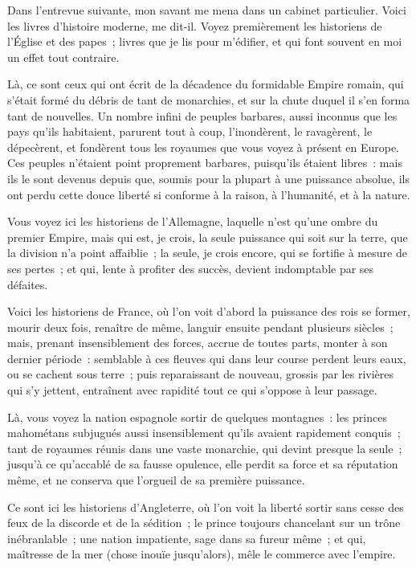 \documentclass[french,twoside]{book} %
\begin{document}
\noindent Dans l’entrevue suivante, mon savant me mena dans un cabinet particulier. Voici les livres d’histoire moderne, me dit-il. Voyez premièrement les historiens de l’Église et des papes ; livres que je lis pour m’édifier, et qui font souvent en moi un effet tout contraire.\par
Là, ce sont ceux qui ont écrit de la décadence du formidable Empire romain, qui s’était formé du débris de tant de monarchies, et sur la chute duquel il s’en forma tant de nouvelles. Un nombre infini de peuples barbares, aussi inconnus que les pays qu’ils habitaient, parurent tout à coup, l’inondèrent, le ravagèrent, le dépecèrent, et fondèrent tous les royaumes que vous voyez à présent en Europe. Ces peuples n’étaient point proprement barbares, puisqu’ils étaient libres : mais ils le sont devenus depuis que, soumis pour la plupart à une puissance absolue, ils ont perdu cette douce liberté si conforme à la raison, à l’humanité, et à la nature.\par
Vous voyez ici les historiens de l’Allemagne, laquelle n’est qu’une ombre du premier Empire, mais qui est, je crois, la seule puissance qui soit sur la terre, que la division n’a point affaiblie ; la seule, je crois encore, qui se fortifie à mesure de ses pertes ; et qui, lente à profiter des succès, devient indomptable par ses défaites.\par
Voici les historiens de France, où l’on voit d’abord la puissance des rois se former, mourir deux fois, renaître de même, languir ensuite pendant plusieurs siècles ; mais, prenant insensiblement des forces, accrue de toutes parts, monter à son dernier période : semblable à ces fleuves qui dans leur course perdent leurs eaux, ou se cachent sous terre ; puis reparaissant de nouveau, grossis par les rivières qui s’y jettent, entraînent avec rapidité tout ce qui s’oppose à leur passage.\par
Là, vous voyez la nation espagnole sortir de quelques montagnes : les princes mahométans subjugués aussi insensiblement qu’ils avaient rapidement conquis ; tant de royaumes réunis dans une vaste monarchie, qui devint presque la seule ; jusqu’à ce qu’accablé de sa fausse opulence, elle perdit sa force et sa réputation même, et ne conserva que l’orgueil de sa première puissance.\par
Ce sont ici les historiens d’Angleterre, où l’on voit la liberté sortir sans cesse des feux de la discorde et de la sédition ; le prince toujours chancelant sur un trône inébranlable ; une nation impatiente, sage dans sa fureur même ; et qui, maîtresse de la mer (chose inouïe jusqu’alors), mêle le commerce avec l’empire.\par
\end{document}
